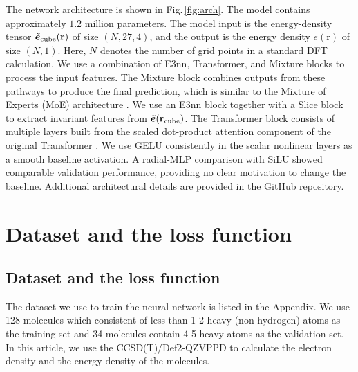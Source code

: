 \documentclass[%
twocolumn,
amsmath,
amssymb,
groupedaddress,
reprint,%
]{revtex4-2}
\newcommand{\Fig}[1]{Fig.\,\ref{#1}}
\newcommand{\brm}[1]{\bm{\mathrm{#1}}}
\begin{document}
The network architecture is shown in \Fig{fig:arch}.
% 
The model contains approximately $1.2$ million parameters.
%
The model input is the energy-density tensor ${\tilde{\bm{e}}_{\rm{cube}}(\brm{r})}$ of size $(N, 27, 4)$, and the output is the energy density ${e(\brm{r})}$ of size $(N, 1)$.
% 
Here, $N$ denotes the number of grid points in a standard DFT calculation.
% 
We use a combination of E3nn, Transformer, and Mixture blocks to process the input features.
% 
The Mixture block combines outputs from these pathways to produce the final prediction, which is similar to the Mixture of Experts (MoE) architecture \cite{caiSurveyMixtureExperts2025}.
% 
We use an E3nn block \cite{geigerE3nnEuclideanNeural2022-07-18} together with a Slice block to extract invariant features from $\tilde{\bm{e}}(\brm{r}_{\rm{cube}})$.
%
The Transformer block consists of multiple layers built from the scaled dot-product attention component of the original Transformer \cite{vaswaniAttentionAllYou2023-08-02}.
% 
We use GELU consistently in the scalar nonlinear layers as a smooth baseline activation. A radial-MLP comparison with SiLU showed comparable validation performance, providing no clear motivation to change the baseline.
%
Additional architectural details are provided in the GitHub repository\cite{TODO:}.



\section{Dataset and the loss function}
\subsection{Dataset and the loss function}
The dataset we use to train the neural network is listed in the Appendix.
%
We use 128 molecules which consistent of less than 1-2 heavy (non-hydrogen) atoms as the training set and 34 molecules contain 4-5 heavy atoms as the validation set.
% 
In this article, we use the CCSD(T)/Def2-QZVPPD \cite{bartlettCoupledclusterTheoryQuantum2007-02-22,weigendBalancedBasisSets2005,zhengMinimallyAugmentedKarlsruhe2011-02} to calculate the electron density and the energy density of the molecules.
\end{document}
